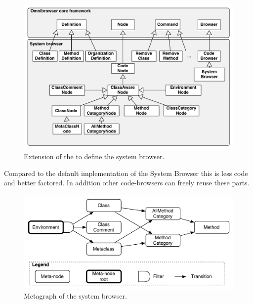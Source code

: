 \documentclass[a4paper,10pt,twoside]{book}
\begin{document}




\begin{figure}[!ht]
\begin{center}
\includegraphics[scale=0.55]{obInternal.pdf}
\caption{Extension of the \obf to define the system browser.} 
\end{center}
\end{figure}


Compared to the default implementation of the \pharo System Browser this is less code and better factored. In addition other code-browsers can freely reuse these parts.

\begin{figure}[!ht]
\begin{center}
\includegraphics[scale=0.55]{ob-graph.pdf}
\caption{Metagraph of the system browser.} 
\end{center}
\end{figure}
\end{document}
